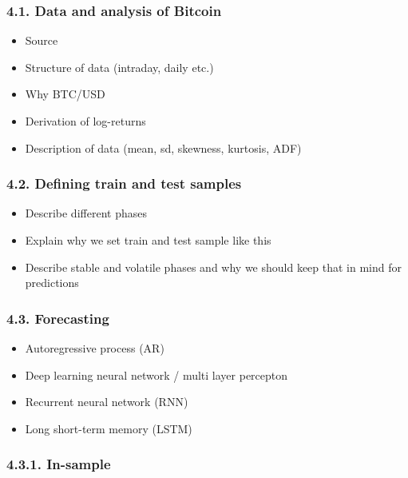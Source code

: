 \documentclass[
]{article}
\begin{document}
\hypertarget{data-and-analysis-of-bitcoin}{%
\subsubsection{4.1. Data and analysis of
Bitcoin}\label{data-and-analysis-of-bitcoin}}

\begin{itemize}
\item
  Source
\item
  Structure of data (intraday, daily etc.)
\item
  Why BTC/USD
\item
  Derivation of log-returns
\item
  Description of data (mean, sd, skewness, kurtosis, ADF)
\end{itemize}

\hypertarget{defining-train-and-test-samples}{%
\subsubsection{4.2. Defining train and test
samples}\label{defining-train-and-test-samples}}

\begin{itemize}
\item
  Describe different phases
\item
  Explain why we set train and test sample like this
\item
  Describe stable and volatile phases and why we should keep that in
  mind for predictions
\end{itemize}

\hypertarget{forecasting}{%
\subsubsection{4.3. Forecasting}\label{forecasting}}

\begin{itemize}
\item
  Autoregressive process (AR)
\item
  Deep learning neural network / multi layer percepton
\item
  Recurrent neural network (RNN)
\item
  Long short-term memory (LSTM)
\end{itemize}

\hypertarget{in-sample}{%
\subsubsection{4.3.1. In-sample}\label{in-sample}}
\end{document}
